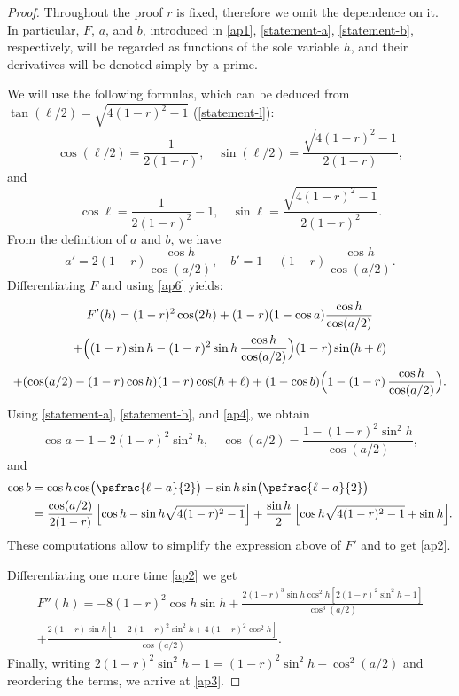 \begin{proof}
Throughout the proof $r$ is fixed, therefore we omit the dependence on it. In particular, $F$, $a$, and $b$, introduced in \eqref{ap1}, \eqref{statement-a}, \eqref{statement-b}, respectively, will be regarded as functions of the sole variable $h$, and their derivatives will be denoted simply by a prime.

We will use the following formulas, which can be deduced from $\tan(\ell/2)=\sqrt{4(1-r)^2-1}$ (\cf \eqref{statement-l}):
\begin{equation}\label{ap4}
\cos(\ell/2)=\frac{1}{2(1-r)}, \quad \sin(\ell/2)=\frac{\sqrt{4(1-r)^2-1}}{2(1-r)},
\end{equation}
and
\begin{equation}\label{ap5}
\cos\ell=\frac{1}{2(1-r)^2} - 1,\quad \sin\ell=\frac{\sqrt{4(1-r)^2-1}}{2(1-r)^2}.
\end{equation}
From the definition of $a$ and $b$, we have
\begin{equation}\label{ap6}
a'=2(1-r) \frac{\cos h}{\cos(a/2)},\quad
b'=1 - (1-r) \frac{\cos h}{\cos(a/2)}.
\end{equation}
Differentiating $F$ and using \eqref{ap6} yields:
\begin{multline*}
F'(h)=(1-r)^2 \cos(2h) +(1-r) (1-\cos a)\frac{\cos h}{\cos(a/2)}\\
+\Bigl((1-r)\sin h-(1-r)^2 \sin h\, \frac{\cos h}{\cos(a/2)}\Bigr) (1-r) \sin(h+\ell)\\
+(\cos(a/2)-(1-r)\cos h) (1-r) \cos(h+\ell) +(1-\cos b) \Bigl(1-(1-r)\, \frac{\cos h}{\cos(a/2)}\Bigr).
\end{multline*}
Using \eqref{statement-a}, \eqref{statement-b}, and \eqref{ap4}, we obtain
\[
\cos a= 1- 2(1-r)^2\sin^2 h,\quad \cos(a/2)=\frac{1-(1-r)^2\sin^2 h}{\cos(a/2)},
\]
and
\begin{align*}
\cos b&=\cos h \cos\bigl(\psfrac{\ell-a}{2}\bigr)-\sin h \sin\bigl(\psfrac{\ell -a}{2}\bigr)\\
&=\frac{\cos(a/2)}{2(1-r)}\,\Bigl[\cos h-\sin h \sqrt{4(1-r)^2-1} \Bigr]+
\frac{\sin h}{2}\,\Bigl[\cos h \sqrt{4(1-r)^2-1}
+ \sin h\Bigr].
\end{align*}
These computations allow to simplify the expression above of $F'$ and to get \eqref{ap2}.

Differentiating one more time \eqref{ap2} we get
\begin{multline*}
F''(h)=-8 (1-r)^2 \cos h \sin h + \frac{2(1-r)^3 \sin h \cos^2 h \left[ 2(1-r)^2 \sin^2 h - 1\right]}{\cos^3(a/2)}
\\
+\frac{2 (1-r)\sin h\left[ 1-2(1-r)^2\sin^2 h + 4 (1-r)^2 \cos^2 h \right]}{\cos(a/2)}.
\end{multline*}
Finally, writing $2(1-r)^2\sin^2h - 1 = (1-r)^2\sin^2 h - \cos^2(a/2)$ and reordering the terms, we arrive at \eqref{ap3}.


\end{proof}
